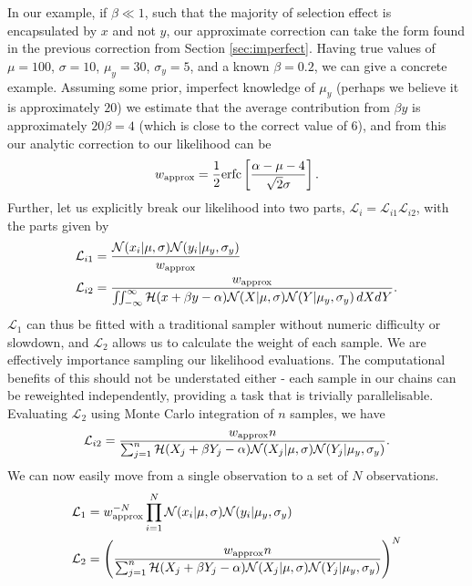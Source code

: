 \documentclass[a4paper,fleqn,usenatbib]{mnras}
\begin{document}
In our example, if $\beta \ll 1$, such that the majority of selection effect is encapsulated by $x$ and not $y$, our approximate correction can take the form found in the previous correction from Section \ref{sec:imperfect}. Having true values of $\mu = 100$, $\sigma = 10$, $\mu_y = 30$, $\sigma_y = 5$, and a known $\beta = 0.2$, we can give a concrete example. Assuming some prior, imperfect knowledge of $\mu_y$ (perhaps we believe it is approximately $20$) we estimate that the average contribution from $\beta y$ is approximately $20\beta = 4$ (which is close to the correct value of $6$), and from this our analytic correction to our likelihood can be
\begin{align}
w_{\rm approx} = \frac{1}{2} {\rm erfc}\left[ \frac{\alpha - \mu - 4}{\sqrt{2}\sigma} \right].
\end{align}
Further, let us explicitly break our likelihood into two parts, $\mathcal{L}_i = \mathcal{L}_{i1} \mathcal{L}_{i2}$, with the parts given by
\begin{align}
\mathcal{L}_{i1} &= \frac{ \mathcal{N}(x_i|\mu, \sigma) \mathcal{N}(y_i|\mu_y, \sigma_y)}{w_{\rm approx} } \\
\mathcal{L}_{i2} &= \frac{ w_{\rm approx}  }{\iint_{-\infty}^\infty \mathcal{H}(x + \beta y - \alpha) \mathcal{N}(X|\mu, \sigma) \mathcal{N}(Y|\mu_y, \sigma_y)\, dX dY}.
\end{align}
$\mathcal{L}_1$ can thus be fitted with a traditional sampler without numeric difficulty or slowdown, and $\mathcal{L}_2$ allows us to calculate the weight of each sample. We are effectively importance sampling our likelihood evaluations. The computational benefits of this should not be understated either - each sample in our chains can be reweighted independently, providing a task that is trivially parallelisable. Evaluating $\mathcal{L}_2$ using Monte Carlo integration of $n$ samples, we have
\begin{align}
\mathcal{L}_{i2} = \frac{ w_{\rm approx}  n }{\sum_{j=1}^{n} \mathcal{H}(X_j + \beta Y_j - \alpha) \mathcal{N}(X_j|\mu, \sigma) \mathcal{N}(Y_j|\mu_y, \sigma_y)} \label{eq:mc}.
\end{align}
We can now easily move from a single observation to a set of $N$ observations.
\begin{align}
\mathcal{L}_1 &= w_{\rm approx}^{-N} \prod_{i=1}^N \mathcal{N}(x_i|\mu, \sigma) \mathcal{N}(y_i|\mu_y, \sigma_y) \\
\mathcal{L}_{2} &= \left(  \frac{ w_{\rm approx}  n }{\sum_{j=1}^{n} \mathcal{H}(X_j + \beta Y_j - \alpha) \mathcal{N}(X_j|\mu, \sigma) \mathcal{N}(Y_j|\mu_y, \sigma_y)}\right)^N
\end{align}
\end{document}
